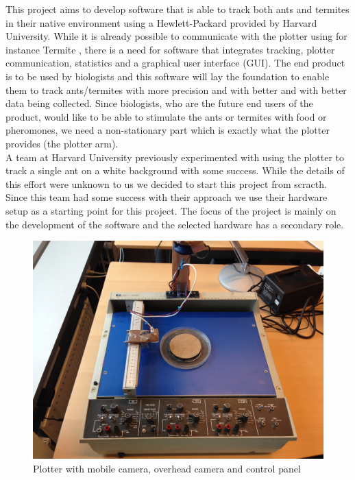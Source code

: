 This project aims to develop software that is able to track both ants and termites in their native environment using a Hewlett-Packard provided by Harvard University. While it is already possible to communicate with the plotter using for instance Termite \cite{termite}, there is a need for software that integrates tracking, plotter communication, statistics and a graphical user interface (GUI). The end product is to be used by biologists and this software will lay the foundation to enable them to track ants/termites with more precision and with better and with better data being collected. Since biologists, who are the future end users of the product, would like to be able to stimulate the ants or termites with food or pheromones, we need a non-stationary part which is exactly what the plotter provides (the plotter arm). \\

A team at Harvard University previously experimented with using the plotter to track a single ant on a white background with some success. While the details of this effort were unknown to us we decided to start this project from scracth. Since this team had some success with their approach we use their hardware setup as a starting point for this project. The focus of the project is mainly on the development of the software and the selected hardware has a secondary role. \\

\begin{figure}
        \centering
        \includegraphics[scale=0.125]{img/plotter}
        \caption{Plotter with mobile camera, overhead camera and control panel}
        \label{fig:plotter}
\end{figure}

